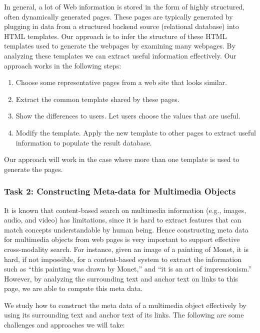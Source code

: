 In general, a lot of Web information is stored in the form of highly
structured, often dynamically generated pages.  These pages are typically
generated by plugging in data from a structured backend source (relational
database) into HTML templates.  Our approach is to infer the structure of
these HTML templates used to generate the webpages by examining many
webpages.  By analyzing these templates we can extract useful information
effectively.  Our approach works in the following steps:

\begin{enumerate}
  \item Choose some representative pages from a web site that looks
  similar.

  \item Extract the common template shared by these pages.

  \item Show the differences to users.  Let users choose the values that
  are useful.

  \item Modify the template.  Apply the new template to other pages to
  extract useful information to populate the result database.
\end{enumerate}

Our approach will work in the case where more than one template is used to
generate the pages.

\subsubsection*{Task 2: Constructing Meta-data for Multimedia Objects}

It is known that content-based search on multimedia information (e.g.,
images, audio, and video) has limitations, since it is hard to extract
features that can match concepts understandable by human being.  Hence
constructing meta data for multimedia objects from web pages is very
important to support effective cross-modality search.  For instance, given
an image of a painting of Monet, it is hard, if not impossible, for a
content-based system to extract the information such as ``this painting
was drawn by Monet,'' and ``it is an art of impressionism.''  However, by
analyzing the surrounding text and anchor text on links to this page, we
are able to compute this meta data.

We study how to construct the meta data of a multimedia object effectively
by using its surrounding text and anchor text of its links.  The following
are some challenges and approaches we will take:

